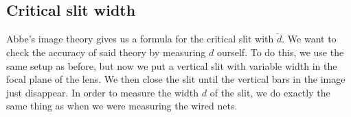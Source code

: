 \subsection{Critical slit width}
\label{chap::slit}
Abbe's image theory gives us a formula for the critical slit with $\tilde{d}$.
We want to check the accuracy of said theory by measuring $d$ ourself.
To do this, we use the same setup as before, but now we put a vertical slit with variable width in the focal plane of the lens. 
We then close the slit until the vertical bars in the image just disappear.
In order to measure the width $d$ of the slit, we do exactly the same thing as when we were measuring the wired nets. 
